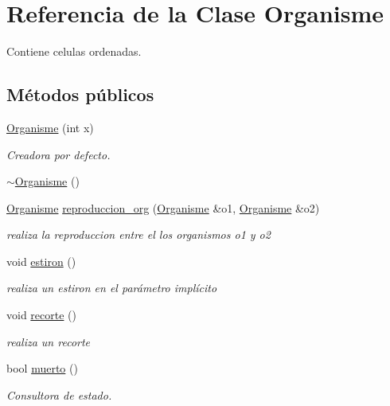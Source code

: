 \hypertarget{class_organisme}{\section{Referencia de la Clase Organisme}
\label{class_organisme}
}


Contiene celulas ordenadas.  


\subsection*{Métodos públicos}
\begin{DoxyCompactItemize}
\item 
\hyperlink{class_organisme_a86e18d319ceca9bb5fd43ac630c78b40}{Organisme} (int x)
\begin{DoxyCompactList}\small\item\em Creadora por defecto. \end{DoxyCompactList}\item 
\hyperlink{class_organisme_a55c9d7cbc9683970ad88455fdc3be7aa}{$\sim$\-Organisme} ()
\item 
\hyperlink{class_organisme}{Organisme} \hyperlink{class_organisme_a06d0ea316a06dc8989fd9bca76a26396}{reproduccion\-\_\-org} (\hyperlink{class_organisme}{Organisme} \&o1, \hyperlink{class_organisme}{Organisme} \&o2)
\begin{DoxyCompactList}\small\item\em realiza la reproduccion entre el los organismos o1 y o2 \end{DoxyCompactList}\item 
void \hyperlink{class_organisme_acdc2be53a7fabf324235c19b313bf662}{estiron} ()
\begin{DoxyCompactList}\small\item\em realiza un estiron en el parámetro implícito \end{DoxyCompactList}\item 
void \hyperlink{class_organisme_ac45268062b8cd33a3a3ab5e70cb2403d}{recorte} ()
\begin{DoxyCompactList}\small\item\em realiza un recorte \end{DoxyCompactList}\item 
bool \hyperlink{class_organisme_a6428a0fc8326f50acbdf24f6a134e60b}{muerto} ()
\begin{DoxyCompactList}\small\item\em Consultora de estado. \end{DoxyCompactList}\item 

\end{DoxyCompactItemize}
